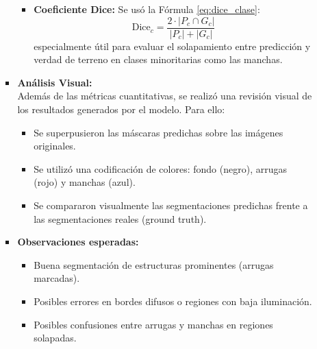 \begin{enumerate}
\begin{itemize}
\begin{itemize}
\begin{itemize}
      \item \textbf{Coeficiente Dice:}
      Se usó la Fórmula \ref{eq:dice_clase}:
      \begin{equation}\label{eq:dice_clase}
        \text{Dice}_c = \frac{2 \cdot |P_c \cap G_c|}{|P_c| + |G_c|}
    \end{equation}
      especialmente útil para evaluar el solapamiento entre predicción y verdad de terreno en clases minoritarias como las manchas.
  
    \end{itemize}
  
    \item \textbf{Análisis Visual:}\\
    Además de las métricas cuantitativas, se realizó una revisión visual de los resultados generados por el modelo. Para ello:
    \begin{itemize}
      \item Se superpusieron las máscaras predichas sobre las imágenes originales.
      \item Se utilizó una codificación de colores: fondo (negro), arrugas (rojo) y manchas (azul).
      \item Se compararon visualmente las segmentaciones predichas frente a las segmentaciones reales (ground truth).
    \end{itemize}
  
    \item \textbf{Observaciones esperadas:}
    \begin{itemize}
      \item Buena segmentación de estructuras prominentes (arrugas marcadas).
      \item Posibles errores en bordes difusos o regiones con baja iluminación.
      \item Posibles confusiones entre arrugas y manchas en regiones solapadas.
    \end{itemize}
  \end{itemize}


\end{itemize}
\end{enumerate}
